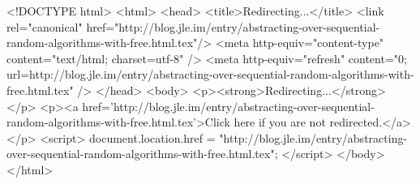 <!DOCTYPE html>
<html>
<head>
<title>Redirecting...</title>
<link rel="canonical" href="http://blog.jle.im/entry/abstracting-over-sequential-random-algorithms-with-free.html.tex"/>
<meta http-equiv="content-type" content="text/html; charset=utf-8" />
<meta http-equiv="refresh" content="0; url=http://blog.jle.im/entry/abstracting-over-sequential-random-algorithms-with-free.html.tex" />
</head>
<body>
  <p><strong>Redirecting...</strong></p>
  <p><a href='http://blog.jle.im/entry/abstracting-over-sequential-random-algorithms-with-free.html.tex'>Click here if you are not redirected.</a></p>
  <script>
    document.location.href = "http://blog.jle.im/entry/abstracting-over-sequential-random-algorithms-with-free.html.tex";
  </script>
</body>
</html>
